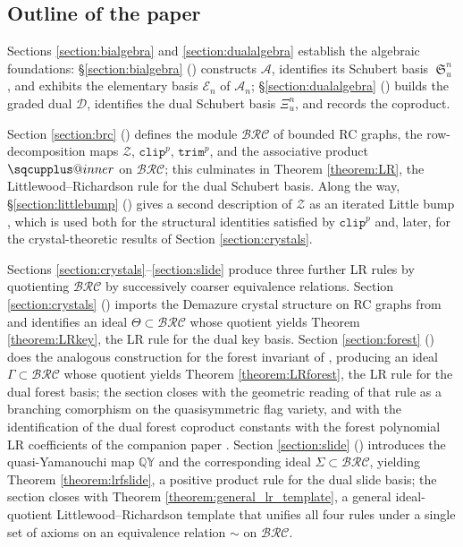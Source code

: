 \documentclass{amsart}
\makeatletter
\newcommand{\sqcupplus@inner}[2]{%
  \vcenter{\hbox{\ooalign{%
    \hfil$\m@th#1\sqcup$\hfil\cr
    \hfil\raisebox{0.15ex}{$\m@th#1\scriptscriptstyle+$}\hfil\cr
  }}}%
}
\newcommand{\sqcupplus}{\mathbin{\mathpalette\sqcupplus@inner\relax}}
\theoremstyle{definition}
\theoremstyle{remark}
\numberwithin{equation}{subsection}
\DeclareMathOperator{\sch}{\mathfrak{S}}
\newcommand{\QY}{\ensuremath{\mathbb{QY}}}
\newcommand{\trm}{\mathtt{trim}}
\newcommand{\zeromap}{\mathcal{Z}}
\newcommand{\clp}{\mathtt{clip}}
\newcommand{\BRC}{\mathcal{BRC}}
\newcommand{\dsch}{\ensuremath{\Xi}}
\newcommand{\coma}{\mathcal{A}}
\newcommand{\dcoma}{\mathcal{D}}
\makeatother
\begin{document}
\subsection*{Outline of the paper}

Sections \ref{section:bialgebra} and \ref{section:dualalgebra} establish the algebraic foundations: \S\ref{section:bialgebra} () constructs $\coma$, identifies its Schubert basis $\sch_u^n$, and exhibits the elementary basis $\mathcal{E}_n$ of $\coma_n$; \S\ref{section:dualalgebra} () builds the graded dual $\dcoma$, identifies the dual Schubert basis $\dsch_u^n$, and records the coproduct.

Section \ref{section:brc} () defines the module $\BRC$ of bounded RC graphs, the row-decomposition maps $\zeromap$, $\clp^p$, $\trm^p$, and the associative product $\sqcupplus$ on $\BRC$; this culminates in Theorem \ref{theorem:LR}, the Littlewood--Richardson rule for the dual Schubert basis. Along the way, \S\ref{section:littlebump} () gives a second description of $\zeromap$ as an iterated Little bump \cite{little2003combinatorial}, which is used both for the structural identities satisfied by $\clp^p$ and, later, for the crystal-theoretic results of Section \ref{section:crystals}.

Sections \ref{section:crystals}--\ref{section:slide} produce three further LR rules by quotienting $\BRC$ by successively coarser equivalence relations. Section \ref{section:crystals} () imports the Demazure crystal structure on RC graphs from \cite{assaf2018demazure} and identifies an ideal $\Theta\subset\BRC$ whose quotient yields Theorem \ref{theorem:LRkey}, the LR rule for the dual key basis. Section \ref{section:forest} () does the analogous construction for the forest invariant of \cite{nadeau2024forest}, producing an ideal $\Gamma\subset\BRC$ whose quotient yields Theorem \ref{theorem:LRforest}, the LR rule for the dual forest basis; the section closes with the geometric reading of that rule as a branching comorphism on the quasisymmetric flag variety, and with the identification of the dual forest coproduct constants with the forest polynomial LR coefficients of the companion paper \cite{companionforest}. Section \ref{section:slide} () introduces the quasi-Yamanouchi map $\QY$ and the corresponding ideal $\Sigma\subset\BRC$, yielding Theorem \ref{theorem:lrfslide}, a positive product rule for the dual slide basis; the section closes with Theorem \ref{theorem:general_lr_template}, a general ideal-quotient Littlewood--Richardson template that unifies all four rules under a single set of axioms on an equivalence relation $\sim$ on $\BRC$.
\end{document}

